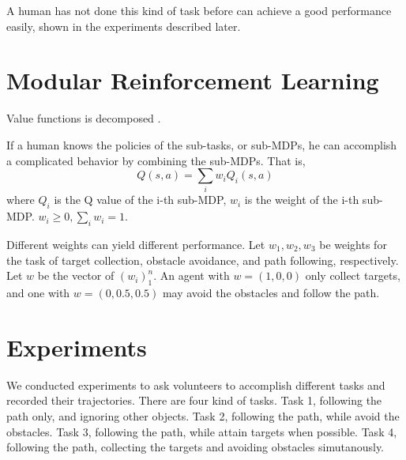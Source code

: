 \documentclass[11pt]{article} %
\begin{document}
A human has not done this kind of task before can achieve a good performance
easily, shown in the experiments described later.

\section{Modular Reinforcement Learning}

Value functions is decomposed \cite{koller1999computing}.

 If a human knows the policies
of the sub-tasks, or sub-MDPs, he can accomplish a complicated behavior by
combining the sub-MDPs. That is,
$$Q(s, a) = \sum_i w_i Q_i (s, a)$$
where $Q_i$ is the Q value of the i-th sub-MDP, $w_i$ is the weight of the i-th
sub-MDP. $w_i \geq 0, \sum_i w_i = 1$.

Different weights can yield different performance. Let $w_1, w_2, w_3$ be
weights for the task of target collection, obstacle avoidance, and path
following, respectively. Let $w$ be the vector of $(w_i)_1^n$. An agent with $w
= (1, 0, 0)$ only collect targets, and one with $w = (0, 0.5, 0.5)$ may avoid
the obstacles and follow the path.

\section{Experiments}

We conducted experiments to ask volunteers to accomplish different tasks and
recorded their trajectories. There are four kind of tasks. Task 1, following the
path only, and ignoring other objects. Task 2, following the path, while avoid
the obstacles. Task 3, following the path, while attain targets when possible.
Task 4, following the path, collecting the targets and avoiding obstacles
simutanously.
\end{document}
